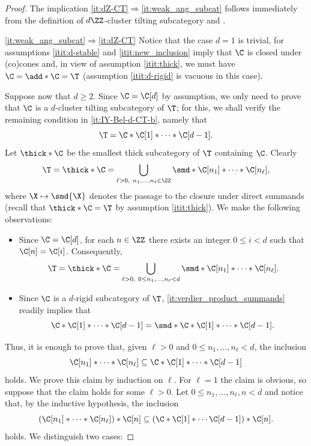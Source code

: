 \documentclass[a4paper]{amsart}
\begin{document}
\begin{proof}
  The implication \eqref{it:dZ-CT}$\Rightarrow$\eqref{it:weak_ang_subcat}
  follows immediately from the definition of $d\ZZ$-cluster tilting subcategory
  and .

  \eqref{it:weak_ang_subcat}$\Rightarrow$\eqref{it:dZ-CT} Notice that the case
  $d=1$ is trivial, for assumptions \eqref{itit:d-stable} and
  \eqref{itit:new_inclusion} imply that $\C$ is closed under (co)cones and, in
  view of assumption \eqref{itit:thick}, we must have $\C=\add*{\C}=\T$
  (assumption \eqref{itit:d-rigid} is vacuous in this case).

  Suppose now that $d\geq2$. Since $\C=\C[d]$ by assumption, we only need to
  prove that $\C$ is a $d$-cluster tilting subcategory of $\T$; for this, we
  shall verify the remaining condition in
  \eqref{it:IY-Bel-d-CT-b}, namely that
  \[
    \T=\C*\C[1]*\cdots*\C[d-1].
  \]
  Let $\thick*{\C}$ be the smallest thick subcategory of $\T$ containing $\C$.
  Clearly~\cite[Lemma~2.15(a)]{AI12}
  \[
    \T=\thick*{\C}=\bigcup_{\ell>0,\
      n_1,\dots,n_\ell\in\ZZ}\smd*{\C[n_1]*\cdots*\C[n_\ell]},
  \]
  where $\X\mapsto\smd{\X}$ denotes the passage to the closure under direct
  summands (recall that $\thick*{\C}=\T$ by assumption \eqref{itit:thick}). We
  make the following observations:
  \begin{itemize}
  \item Since $\C=\C[d]$, for each $n\in\ZZ$ there exists an integer $0\leq i<d$
    such that $\C[n]=\C[i]$. Consequently,
    \[
      \T=\thick*{\C}=\bigcup_{\ell>0,\ 0\leq
        n_1,\dots,n_\ell<d}\smd*{\C[n_1]*\cdots*\C[n_\ell]}.
    \]
  \item Since $\C$ is a $d$-rigid subcategory of $\T$,
    \eqref{it:verdier_product_summands} readily
    implies that
    \[
      \C*\C[1]*\cdots*\C[d-1]=\smd*{\C*\C[1]*\cdots*\C[d-1]}.
    \]
  \end{itemize}
  Thus, it is enough to prove that,
  given $\ell>0$ and $0\leq n_1,\dots,n_\ell<d$, the inclusion
  \[
    \C[n_1]*\cdots*\C[n_\ell]\subseteq\C*\C[1]*\cdots*\C[d-1]
  \]
  holds. We prove this claim by induction on $\ell$. For $\ell=1$ the claim is obvious,
  so suppose that the claim holds for some $\ell>0$. Let $0\leq
  n_1,\dots,n_\ell,n<d$ and notice that, by the inductive hypothesis, the
  inclusion
  \[
    (\C[n_1]*\cdots*\C[n_\ell])*\C[n]\subseteq(\C*\C[1]*\cdots\C[d-1])*\C[n].
  \]
  holds. We distinguish two cases:


\end{proof}
\end{document}
